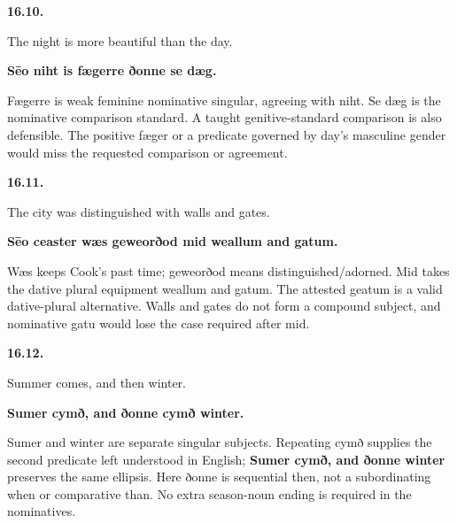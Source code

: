 \par\begin{minipage}{\linewidth}\raggedright
\textbf{16.10.}

The night is more beautiful than the day.

\textbf{Sēo niht is fægerre ðonne se dæg.}

Fægerre is weak feminine nominative singular, agreeing with niht. Se dæg is the nominative comparison standard. A taught genitive-standard comparison is also defensible. The positive fæger or a predicate governed by day's masculine gender would miss the requested comparison or agreement.

\end{minipage}\par\addvspace{4pt}

\par\begin{minipage}{\linewidth}\raggedright
\textbf{16.11.}

The city was distinguished with walls and gates.

\textbf{Sēo ceaster wæs geweorðod mid weallum and gatum.}

Wæs keeps Cook's past time; geweorðod means distinguished/\allowbreak{}adorned. Mid takes the dative plural equipment weallum and gatum. The attested geatum is a valid dative-plural alternative. Walls and gates do not form a compound subject, and nominative gatu would lose the case required after mid.

\end{minipage}\par\addvspace{4pt}

\par\begin{minipage}{\linewidth}\raggedright
\textbf{16.12.}

Summer comes, and then winter.

\textbf{Sumer cymð, and ðonne cymð winter.}

Sumer and winter are separate singular subjects. Repeating cymð supplies the second predicate left understood in English; \textbf{Sumer cymð, and ðonne winter} preserves the same ellipsis. Here ðonne is sequential then, not a subordinating when or comparative than. No extra season-noun ending is required in the nominatives.

\end{minipage}\par\addvspace{4pt}

